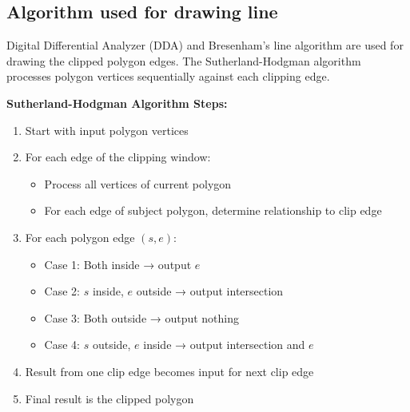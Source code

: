 \documentclass[12pt,a4paper]{article}
\begin{document}
\subsection{Algorithm used for drawing line}
Digital Differential Analyzer (DDA) and Bresenham's line algorithm are used for drawing the clipped polygon edges. The Sutherland-Hodgman algorithm processes polygon vertices sequentially against each clipping edge.

\textbf{Sutherland-Hodgman Algorithm Steps:}
\begin{enumerate}
    \item Start with input polygon vertices
    \item For each edge of the clipping window:
    \begin{itemize}
        \item Process all vertices of current polygon
        \item For each edge of subject polygon, determine relationship to clip edge
    \end{itemize}
    \item For each polygon edge $(s, e)$:
    \begin{itemize}
        \item Case 1: Both inside → output $e$
        \item Case 2: $s$ inside, $e$ outside → output intersection
        \item Case 3: Both outside → output nothing
        \item Case 4: $s$ outside, $e$ inside → output intersection and $e$
    \end{itemize}
    \item Result from one clip edge becomes input for next clip edge
    \item Final result is the clipped polygon
\end{enumerate}
\end{document}
